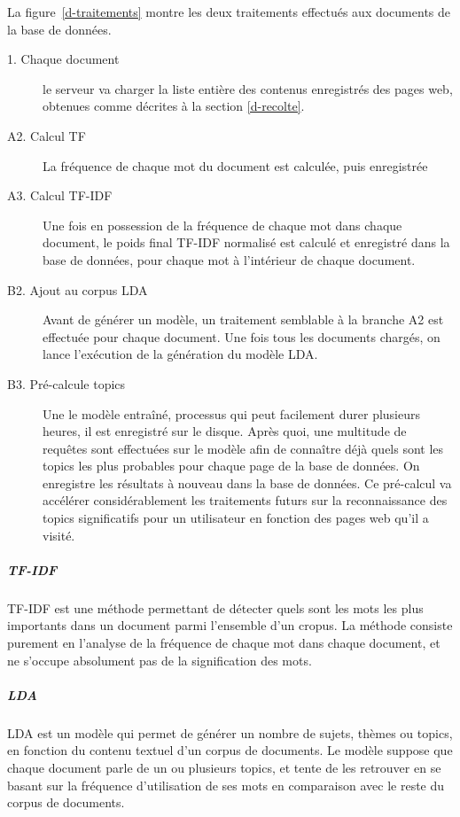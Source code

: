 				La figure~\ref{d-traitements} montre les deux traitements effectués aux documents de la base de données.

				\begin{description}
					\item[1. Chaque document] le serveur va charger la liste entière des contenus enregistrés des pages web, obtenues comme décrites à la section \ref{d-recolte}.
					\item[A2. Calcul TF] La fréquence de chaque mot du document est calculée, puis enregistrée
					\item[A3. Calcul TF-IDF] Une fois en possession de la fréquence de chaque mot dans chaque document, le poids final TF-IDF normalisé est calculé et enregistré dans la base de données, pour chaque mot à l'intérieur de chaque document.
					\item[B2. Ajout au corpus LDA] Avant de générer un modèle, un traitement semblable à la branche A2 est effectuée pour chaque document. Une fois tous les documents chargés, on lance l'exécution de la génération du modèle LDA.
					\item[B3. Pré-calcule topics] Une le modèle entraîné, processus qui peut facilement durer plusieurs heures, il est enregistré sur le disque. Après quoi, une multitude de requêtes sont effectuées sur le modèle afin de connaître déjà quels sont les topics les plus probables pour chaque page de la base de données. On enregistre les résultats à nouveau dans la base de données. Ce pré-calcul va accélérer considérablement les traitements futurs sur la reconnaissance des topics significatifs pour un utilisateur en fonction des pages web qu'il a visité. 

				\end{description}

				\subparagraph{TF-IDF}

					TF-IDF est une méthode permettant de détecter quels sont les mots les plus importants dans un document parmi l'ensemble d'un cropus. La méthode consiste purement en l'analyse de la fréquence de chaque mot dans chaque document, et ne s'occupe absolument pas de la signification des mots.

				\subparagraph{LDA}

					LDA est un modèle qui permet de générer un nombre de sujets, thèmes ou topics, en fonction du contenu textuel d'un corpus de documents. Le modèle suppose que chaque document parle de un ou plusieurs topics, et tente de les retrouver en se basant sur la fréquence d'utilisation de ses mots en comparaison avec le reste du corpus de documents. 

